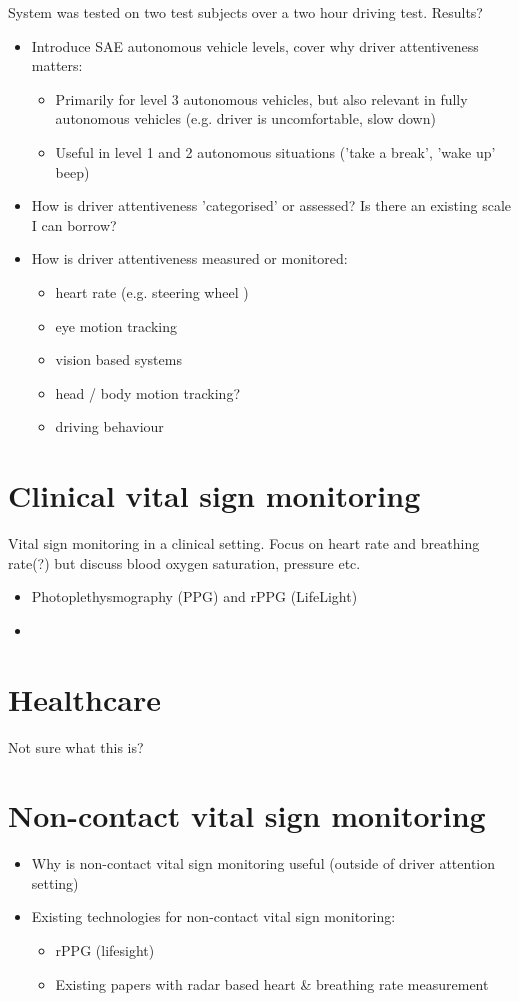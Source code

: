 \documentclass[11pt, parskip=half*,twoside=false]{scrbook}
\begin{document}
System was tested on two test subjects over a two hour driving test.  Results? 



\begin{itemize}
	\item Introduce SAE autonomous vehicle levels, cover why driver attentiveness matters:
	\begin{itemize}
		\item Primarily for level 3 autonomous vehicles, but also relevant in fully autonomous vehicles (e.g. driver is uncomfortable, slow down)
		\item Useful in level 1 and 2 autonomous situations ('take a break', 'wake up' beep)
	\end{itemize}
	\item How is driver attentiveness 'categorised' or assessed? Is there an existing scale I can borrow?
	\item How is driver attentiveness measured or monitored:
	\begin{itemize}
		\item heart rate (e.g. steering wheel )
		\item eye motion tracking
		\item vision based systems
		\item head / body motion tracking?
		\item driving behaviour
	\end{itemize}
\end{itemize}

\section{Clinical vital sign monitoring}
Vital sign monitoring in a clinical setting. Focus on heart rate and breathing rate(?) but discuss blood oxygen saturation, pressure etc.

\begin{itemize}
	\item Photoplethysmography (PPG) and rPPG (LifeLight)
	\item 
\end{itemize}

\section{Healthcare}
Not sure what this is?

\section{Non-contact vital sign monitoring}
\begin{itemize}
	\item Why is non-contact vital sign monitoring useful (outside of driver attention setting)
	\item Existing technologies for non-contact vital sign monitoring:
	\begin{itemize}
		\item rPPG (lifesight)
		\item Existing papers with radar based heart \& breathing rate measurement
	\end{itemize}
\end{itemize}
\end{document}
